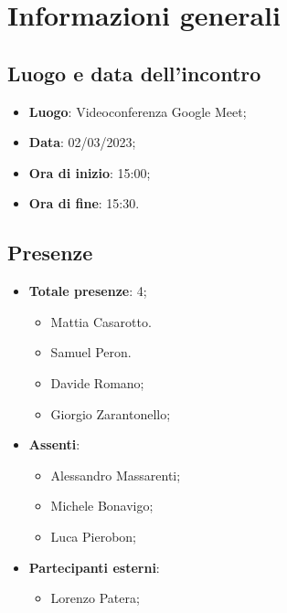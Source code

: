 \section{Informazioni generali}

    \subsection{Luogo e data dell'incontro}
    \begin{itemize}
        \item \textbf{Luogo}: Videoconferenza Google Meet;
        \item \textbf{Data}: 02/03/2023;
        \item \textbf{Ora di inizio}: 15:00;
        \item \textbf{Ora di fine}: 15:30.
    \end{itemize}
    \subsection{Presenze}
    \begin{itemize}
        \item \textbf{Totale presenze}: 4;
        \begin{itemize}
            \item Mattia Casarotto.
            \item Samuel Peron.
            \item Davide Romano;
            \item Giorgio Zarantonello;
        \end{itemize}
        \item \textbf{Assenti}:
        \begin{itemize}
            \item Alessandro Massarenti;
            \item Michele Bonavigo;
            \item Luca Pierobon;
        \end{itemize}
        \item \textbf{Partecipanti esterni}:
        \begin{itemize}
            \item Lorenzo Patera;
        \end{itemize}
    \end{itemize}